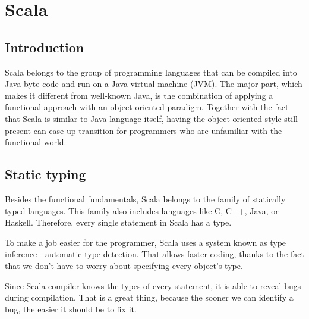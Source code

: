 \section{Scala}
\subsection{Introduction}
Scala belongs to the group of programming languages that can be compiled into Java byte code and run on a Java virtual machine (JVM). The major part, which makes it different from well-known Java, is the combination of applying a functional approach with an object-oriented paradigm. Together with the fact that Scala is similar to Java language itself, having the object-oriented style still present can ease up transition for programmers who are unfamiliar with the functional world.

\subsection{Static typing}

Besides the functional fundamentals, Scala belongs to the family of statically typed languages. This family also includes languages like C, C++, Java, or Haskell. Therefore, every single statement in Scala has a type.\cite{Scala static}

To make a job easier for the programmer, Scala uses a system known as type inference - automatic type detection. That allows faster coding, thanks to the fact that we don’t have to worry about specifying every object’s type. 

Since Scala compiler knows the types of every statement, it is able to reveal bugs during compilation. That is a great thing, because the sooner we can identify a bug, the easier it should be to fix it. 

